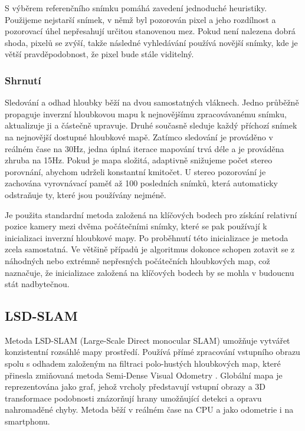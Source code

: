 \documentclass[12pt,a4paper]{article}
\begin{document}
S výběrem referenčního snímku pomáhá zavedení jednoduché heuristiky. Použijeme nejstarší snímek, v němž byl pozorován pixel a jeho rozdílnost a pozorovací úhel nepře\-sahují určitou stanovenou mez. Pokud není nalezena dobrá shoda,  pixelů se zvýší, takže následné vyhledávání používá novější snímky, kde je větší pravděpodobnost, že pixel bude stále viditelný.


\subsubsection{Shrnutí}
Sledování a odhad hloubky běží na dvou samostatných vláknech. Jedno průběžně propaguje inverzní hloubkovou mapu k nejnovějšímu zpracovávanému snímku, aktualizuje ji a částečně upravuje. Druhé současně sleduje každý příchozí snímek na nejnovější dostupné hloubkové mapě. Zatímco sledování je prováděno v reálném čase na 30Hz, jedna úplná iterace mapování trvá déle a je prováděna zhruba na 15Hz. Pokud je mapa složitá, adaptivně snižujeme počet stereo porovnání, abychom udrželi konstantní kmitočet. U stereo pozorování je zachována vyrovnávací paměť až 100 posledních snímků, která automaticky odstraňuje ty, které jsou používány nejméně.

Je použita standardní metoda založená na klíčových bodech pro získání relativní pozice kamery mezi dvěma počátečními snímky, které se pak používají k inicializaci inverzní hloubkové mapy. Po proběhnutí této inicializace je metoda zcela samostatná. Ve většině případů je algoritmus dokonce schopen zotavit se z náhodných nebo extrémně nepřesných počátečních hloubkových map, což naznačuje, že inicializace založená na klíčových bodech by se mohla v budoucnu stát nadbytečnou.

\subsection{LSD-SLAM}
Metoda LSD-SLAM (Large-Scale Direct monocular SLAM) umožňuje vytvářet konzistentní rozsáhlé mapy prostředí. Používá přímé zpracování vstupního obrazu spolu s odhadem založeným na filtraci polo-hustých hloubkových map, které přinesla zmiňovaná metoda Semi-Dense Visual Odometry \cite{Semi-Dense_VO}. Globální mapa je reprezentována jako graf, jehož vrcholy představují vstupní obrazy a 3D transformace podobnosti znázorňují hrany umožňující detekci a opravu nahromaděné chyby. Metoda běží v reálném čase na CPU a jako odometrie i na smartphonu.
\end{document}

